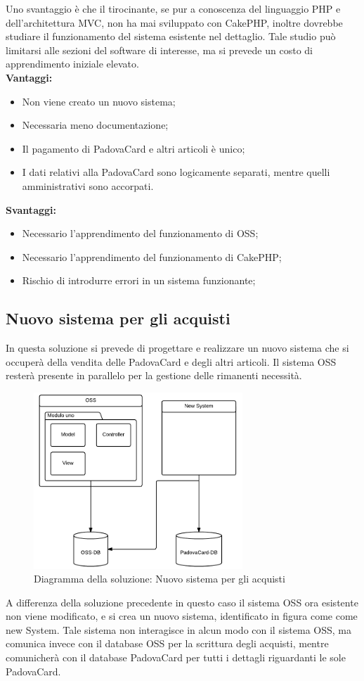 Uno svantaggio è che il tirocinante, se pur a conoscenza del linguaggio PHP e dell'architettura MVC, non ha mai sviluppato con CakePHP, inoltre dovrebbe studiare il funzionamento del sistema esistente nel dettaglio. Tale studio può limitarsi alle sezioni del software di interesse, ma si prevede un costo di apprendimento iniziale elevato.\\
\textbf{Vantaggi:}
\begin{itemize}
\item Non viene creato un nuovo sistema;
\item Necessaria meno documentazione;
\item Il pagamento di PadovaCard e altri articoli è unico;
\item I dati relativi alla PadovaCard sono logicamente separati, mentre quelli amministrativi sono accorpati.
\end{itemize}
\textbf{Svantaggi:}
\begin{itemize}
\item Necessario l'apprendimento del funzionamento di OSS;
\item Necessario l'apprendimento del funzionamento di CakePHP;
\item Rischio di introdurre errori in un sistema funzionante;
\end{itemize}

\subsection{Nuovo sistema per gli acquisti}
In questa soluzione si prevede di progettare e realizzare un nuovo sistema che si occuperà della vendita delle PadovaCard e degli altri articoli. Il sistema OSS resterà presente in parallelo per la gestione delle rimanenti necessità.

\begin{figure}[H]
\centering
\includegraphics[width=0.7\textwidth]{images/Nuovo_sistema_per_gli_acquisti.png}
\caption{Diagramma della soluzione: Nuovo sistema per gli acquisti}
\end{figure}
A differenza della soluzione precedente in questo caso il sistema OSS ora esistente non viene modificato, e si crea un nuovo sistema, identificato in figura come come new System. Tale sistema non interagisce in alcun modo con il sistema OSS, ma comunica invece con il database OSS per la scrittura degli acquisti, mentre comunicherà con il database PadovaCard per tutti i dettagli riguardanti le sole PadovaCard.\\


